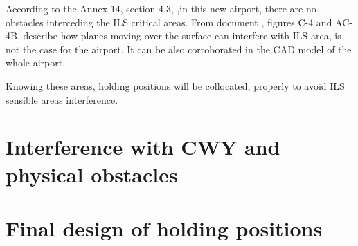 	According to the Annex 14, section 4.3, \cite{Standards2016},in this new airport, there are no obstacles interceding the ILS critical areas. From document \cite{Telecomunicaciones}, figures C-4 and AC-4B, describe how planes moving over the surface can interfere with ILS area, is not the case for the airport. It can be also corroborated in the CAD model of the whole airport. 
	
	Knowing these areas, holding positions will be collocated, properly to avoid ILS sensible areas interference. 
	
	
	\section{Interference with CWY and physical obstacles}

	
	\section{Final design of holding positions}